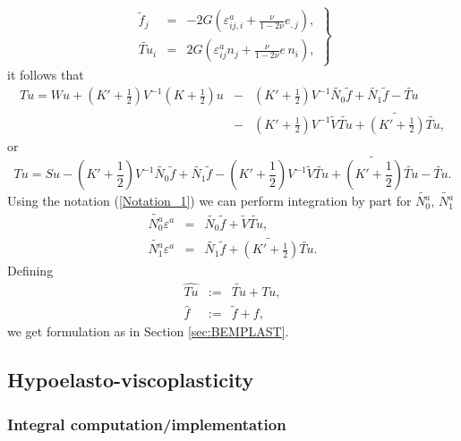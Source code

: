 \begin{equation}\label{Notation_1}
\left.
\begin{array}{rcl}
\widetilde{f}_j&=&-2G\left(\varepsilon_{ij,i}^a+\frac{\nu}{1-2\nu}e_{,j}\right),\\[4ex]
\widetilde{Tu}_i&=&2G\left(\varepsilon_{ij}^a n_j+\frac{\nu}{1-2\nu}e\,n_i\right),
\end{array}\right\}
\end{equation}
it follows that 
\begin{eqnarray}
Tu=Wu+\left(K'+\frac{1}{2}\right)V^{-1}\left(K+\frac{1}{2}\right)u&-&\left(K'+\frac{1}{2}\right)V^{-1}\widetilde{N_0}\widetilde{f}+\widetilde{N_1}\widetilde{f}- \widetilde{Tu}\nonumber \\
&-&\left(K'+\frac{1}{2}\right)V^{-1}\widetilde{V}\widetilde{Tu}+\widetilde{(K'+\frac{1}{2})}\widetilde{Tu}, \nonumber
\end{eqnarray}
or 
\begin{equation}\nonumber
Tu=Su-\left(K'+\frac{1}{2}\right)V^{-1}\widetilde{N_0}\widetilde{f}+\widetilde{N_1}\widetilde{f}-\left(K'+\frac{1}{2}\right)V^{-1}\widetilde{V}\widetilde{Tu}+\widetilde{(K'+\frac{1}{2})}\widetilde{Tu} - \widetilde{Tu}.
\end{equation}
Using the notation (\ref{Notation_1}) we can perform integration by part for  $\widetilde{N^a_0}$, $\widetilde{N^a_1}$
\begin{eqnarray}
\widetilde{N^a_0} \varepsilon^a & = & \widetilde{N_0} \widetilde{f} + \widetilde{V} \widetilde{Tu}, \nonumber \\
\widetilde{N^a_1} \varepsilon^a & = & \widetilde{N_1} \widetilde{f} + \widetilde{(K'+\frac{1}{2})}\widetilde{Tu}. \nonumber
\end{eqnarray}
Defining 
\begin{eqnarray}
\widehat{Tu}& := & \widetilde{Tu} +Tu, \nonumber \\
\widehat{f}& := & \widetilde{f} +f, \nonumber 
\end{eqnarray}
we get formulation as in Section \ref{sec:BEMPLAST}.


\subsection{Hypoelasto-viscoplasticity}\label{sec:Numeric:LargeStrain}
\subsubsection{Integral computation/implementation}

